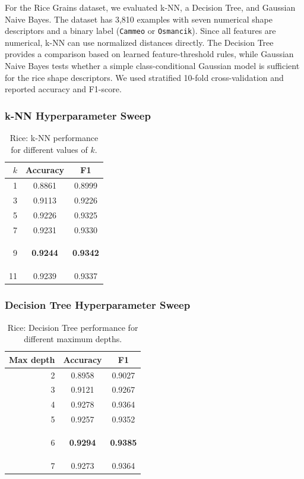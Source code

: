 \documentclass[11pt]{article}
\newcommand{\best}[1]{\colorbox{bestgray}{\strut\textbf{#1}}}
\begin{document}
For the Rice Grains dataset, we evaluated k-NN, a Decision Tree, and Gaussian Naive
Bayes. The dataset has 3,810 examples with seven numerical shape descriptors and a
binary label (\texttt{Cammeo} or \texttt{Osmancik}). Since all features are numerical,
k-NN can use normalized distances directly. The Decision Tree provides a comparison
based on learned feature-threshold rules, while Gaussian Naive Bayes tests whether a
simple class-conditional Gaussian model is sufficient for the rice shape descriptors.
We used stratified 10-fold cross-validation and reported accuracy and F1-score.

\subsubsection*{k-NN Hyperparameter Sweep}

\begin{table}[H]
\centering
\caption{Rice: k-NN performance for different values of $k$.}
\begin{tabular}{rcc}
\toprule
$k$ & Accuracy & F1 \\
\midrule
1  & 0.8861 & 0.8999 \\
3  & 0.9113 & 0.9226 \\
5  & 0.9226 & 0.9325 \\
7  & 0.9231 & 0.9330 \\
9  & \best{0.9244} & \best{0.9342} \\
11 & 0.9239 & 0.9337 \\
\bottomrule
\end{tabular}
\end{table}

\subsubsection*{Decision Tree Hyperparameter Sweep}

\begin{table}[H]
\centering
\caption{Rice: Decision Tree performance for different maximum depths.}
\begin{tabular}{rcc}
\toprule
Max depth & Accuracy & F1 \\
\midrule
2  & 0.8958 & 0.9027 \\
3  & 0.9121 & 0.9267 \\
4  & 0.9278 & 0.9364 \\
5  & 0.9257 & 0.9352 \\
6  & \best{0.9294} & \best{0.9385} \\
7  & 0.9273 & 0.9364 \\
\bottomrule
\end{tabular}
\end{table}
\end{document}
